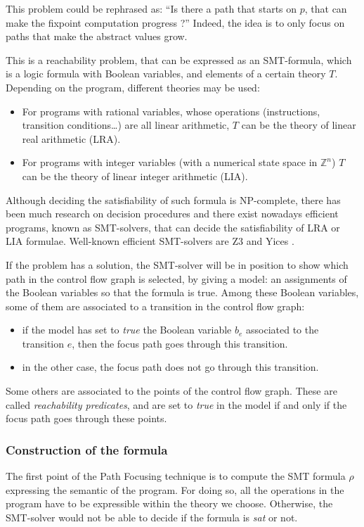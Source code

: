 \documentclass[a4paper,english,titlepage,11pt]{report}
\def\Z{\mathbb{Z}}
\begin{document}
	This problem could be rephrased as:
	``Is there a path that starts on $p$, that can make the fixpoint computation
	progress ?''
	Indeed, the idea is to only focus on paths that make the abstract values
	grow.

	This is a reachability problem, that can be expressed as an SMT-formula,
	which is a logic formula with Boolean variables, and elements of a certain
	theory $T$. Depending on the program, different theories may be used:
	\begin{itemize}
	\item For programs with rational variables, whose operations (instructions,
	transition conditions\dots) are all linear arithmetic, $T$ can be the theory
	of linear real arithmetic (LRA).
	\item For programs with integer variables (with a numerical state space in
	$\Z^n$) $T$ can be the theory of linear integer arithmetic (LIA).
	\end{itemize}

	Although deciding the satisfiability of such formula is NP-complete, there
	has been much research on decision procedures \cite{Kroening08} and there exist nowadays
	efficient programs, known as SMT-solvers, that can decide the satisfiability
	of LRA or LIA formulae. Well-known efficient SMT-solvers are
	Z3 \cite{MouraB08} and Yices \cite{DutertreM06}. 

	If the problem has a solution,  the SMT-solver will be in position to show
	which path in the control flow graph is selected, by giving a model: an
	assignments of the Boolean variables so that the formula is true.
	Among these Boolean variables, some of them are associated to a transition
	in the control flow graph:
	\begin{itemize}
	\item if the model has set to \emph{true} the Boolean variable $b_e$ associated
	to the transition $e$, then the focus path goes through this transition.
	\item in the other case, the focus path does not go through this transition.
	\end{itemize}
	
	Some others are associated to the points of the control flow graph. These
	are called \emph{reachability predicates}, and are set to \emph{true} in the
	model if and only if the focus path goes through these points.

	\subsubsection{Construction of the formula}
	The first point of the Path Focusing technique is to compute the SMT formula
	$\rho$ expressing the semantic of the program. For doing so, all the
	operations in the program have to be expressible within the theory we
	choose. Otherwise, the SMT-solver would not be able to decide if the formula
	is \emph{sat} or not.
\end{document}
